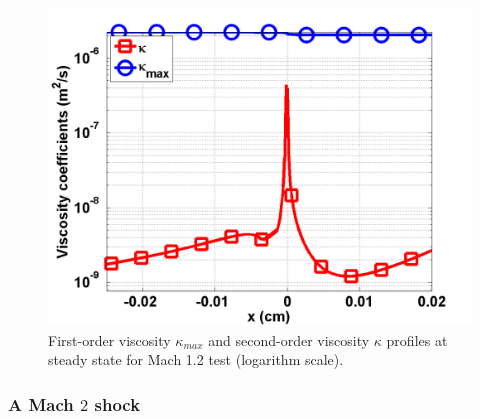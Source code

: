 \documentclass[review]{elsarticle}
\begin{document}
\begin{figure}[H]
                \centering
                \includegraphics[width=\textwidth]{Mach_1p2_nel_1000_viscosity.png}
        \caption{First-order viscosity $\kappa_{max}$ and second-order viscosity $\kappa$ profiles at steady state for Mach 1.2 test (logarithm scale).}\label{fig:Mach12_viscosity}
\end{figure}

\subsubsection{A Mach $2$ shock}
\end{document}
